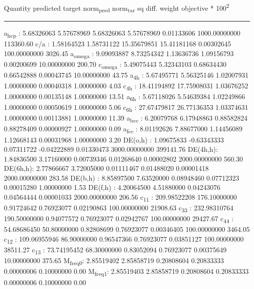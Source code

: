 \documentclass[11pt]{article}
\begin{document}
Quantity      predicted    target     norm\textsubscript{pred}   norm\textsubscript{tar}    sq diff.      weight    objective * 100\textsuperscript{2} 

\noindent\rule{\textwidth}{0.5pt}
a\textsubscript{hcp}   :   5.68326063   5.57678969   5.68326063   5.57678969   0.01133606 1000.00000000    113360.60
c/a     :   1.58164523   1.58731122  15.35679851  15.41181168   0.00302645 100.00000000      3026.45
a\textsubscript{omega} :   9.09093887   8.73254342   1.13636736   1.09156793   0.00200699  10.00000000       200.70
c\textsubscript{omega} :   5.49075443   5.32343103   0.68634430   0.66542888   0.00043745  10.00000000        43.75
a\textsubscript{4h}    :   5.67495771   5.56325146   1.02007931   1.00000000   0.00040318   1.00000000         4.03
c\textsubscript{4h}    :  18.41194892  17.75908031   1.03676252   1.00000000   0.00135148   1.00000000        13.51
a\textsubscript{6h}    :   5.67118026   5.54639384   1.02249866   1.00000000   0.00050619   1.00000000         5.06
c\textsubscript{6h}    :  27.67479817  26.77136353   1.03374631   1.00000000   0.00113881   1.00000000        11.39
a\textsubscript{bcc}   :   6.20079768   6.17948863   0.88582824   0.88278409   0.00000927   1.00000000         0.09
a\textsubscript{fcc}   :   8.01192626   7.88677000   1.14456089   1.12668143   0.00031968   1.00000000         3.20
DE(o,h) :   1.09675833  -0.63343333   0.07311722  -0.04222889   0.01330473 3000.00000000    399141.76
DE(4h,h):   1.84836500   3.17160000   0.00739346   0.01268640   0.00002802 2000.00000000       560.30
DE(6h,h):   2.77866667   3.72005000   0.01111467   0.01488020   0.00001418 2000.00000000       283.58
DE(b,h) :   8.85897500   7.63520000   0.08948460   0.07712323   0.00015280   1.00000000         1.53
DE(f,h) :   4.20064500   4.51880000   0.04243076   0.04564444   0.00001033 2000.00000000       206.56
c\textsubscript{11}    : 209.98522208 176.10000000   0.91724642   0.76923077   0.02190863 100.00000000     21908.63
c\textsubscript{33}    : 232.98310764 190.50000000   0.94077572   0.76923077   0.02942767 100.00000000     29427.67
c\textsubscript{44}    :  54.68686450  50.80000000   0.82808699   0.76923077   0.00346405 100.00000000      3464.05
c\textsubscript{12}    : 109.06955946  86.90000000   0.96547366   0.76923077   0.03851127 100.00000000     38511.27
c\textsubscript{13}    :  73.74195452  68.30000000   0.83052094   0.76923077   0.00375649  10.00000000       375.65
M\textsubscript{freq}\textsubscript{0}:   2.85519402   2.85858719   0.20808604   0.20833333   0.00000006   0.10000000         0.00
M\textsubscript{freq}\textsubscript{1}:   2.85519403   2.85858719   0.20808604   0.20833333   0.00000006   0.10000000         0.00
\end{document}
